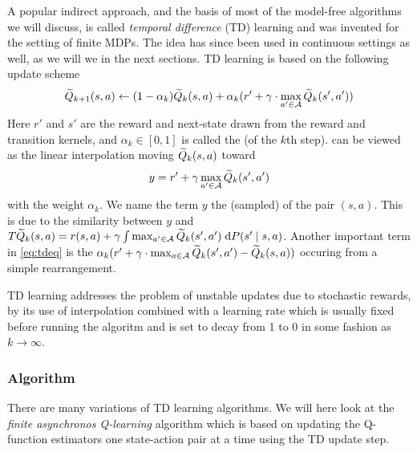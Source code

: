 A popular indirect approach, and the basis of most of the model-free
algorithms we will discuss, is called
\emph{temporal difference} (TD) learning and was invented 
for the setting of finite MDPs.
The idea has since been used in continuous settings
as well, as we will we in the next sections.
TD learning is based on the following
update scheme
\begin{equation}
  \widetilde{Q}_{k+1}(s, a) \leftarrow (1-\alpha_k) \widetilde{Q}_k(s, a)
  + \alpha_k (r' + \gamma \cdot \max_{a' \in \mathcal{A}} \widetilde{Q}_k(s', a'))
  \label{eq:tdeq}
\end{equation}
Here $r'$ and $s'$ are the reward and next-state drawn from the
reward and transition kernels,
and $\alpha_k \in [0,1]$ is called the 
(of the $k$th step).
 can be viewed as the linear interpolation moving
$\widetilde{Q}_k(s, a)$ toward
\[ y = r' + \gamma \max_{a' \in \mathcal{A}} \widetilde{Q}_k(s', a') \]
with the weight $\alpha_k$.
We name the term $y$ the (sampled)  of the pair $(s, a)$.
This is due to the similarity between $y$ and
$T \widetilde{Q}_k(s, a) = r(s, a) + \gamma \int \max_{a' \in \mathcal{A}} \widetilde{Q}_k(s', a')
\; \mathrm{d} P(s' \mid s, a)$.
Another important term in \cref{eq:tdeq} is the
$ \alpha_k ( r' + \gamma \cdot \max_{a \in \mathcal{A}} \widetilde{Q}_k(s', a')
- \widetilde{Q}_k(s, a) )$ occuring from a simple rearrangement.

TD learning addresses the problem of unstable updates due to stochastic
rewards, by its use of interpolation combined with 
a learning rate which is usually fixed before running the algoritm
and is set to decay from 1 to 0 in some fashion as $k \to \infty$.

\subsubsection{Algorithm}

There are many variations of TD learning algorithms.
We will here look at the
\emph{finite asynchronos Q-learning} algorithm
which is based on updating
the Q-function estimators one state-action pair
at a time using the TD update step.

